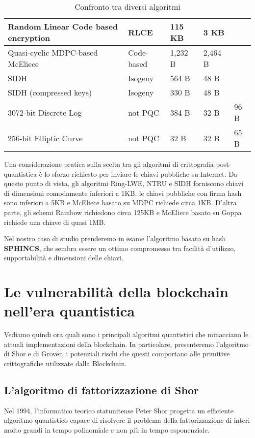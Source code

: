 \begin{table}[]
{\begin{tabular}{|l|l|l|l|l|}
    Random Linear Code based encryption & RLCE           & 115 KB              & 3 KB                 &                    \\ \hline
    Quasi-cyclic MDPC-based McEliece    & Code-based     & 1,232 B             & 2,464 B              &                    \\ \hline
    SIDH                                & Isogeny        & 564 B               & 48 B                 &                    \\ \hline
    SIDH (compressed keys)              & Isogeny        & 330 B               & 48 B                 &                    \\ \hline
    3072-bit Discrete Log               & not PQC        & 384 B               & 32 B                 & 96 B               \\ \hline
    256-bit Elliptic Curve              & not PQC        & 32 B                & 32 B                 & 65 B               \\ \hline
    \end{tabular}
  }
  \caption{Confronto tra diversi algoritmi}
  \label{tab:confronto}
\end{table}

Una considerazione pratica sulla scelta tra gli algoritmi di crittografia post-quantistica è lo sforzo richiesto per inviare le chiavi pubbliche su Internet. Da questo punto di vista, gli algoritmi Ring-LWE, NTRU e SIDH forniscono chiavi di dimensioni comodamente inferiori a 1KB, le chiavi pubbliche con firma hash sono inferiori a 5KB e McEliece basato su MDPC richiede circa 1KB. D'altra parte, gli schemi Rainbow richiedono circa 125KB e McEliece basato su Goppa richiede una chiave di quasi 1MB.

Nel nostro caso di studio prenderemo in esame l'algoritmo basato su hash \textbf{SPHINCS}, che sembra essere un ottimo compromesso tra facilità d'utilizzo, supportabilità e dimensioni delle chiavi.

\section{Le vulnerabilità della blockchain nell'era quantistica}
Vediamo quindi ora quali sono i principali algoritmi quantistici che minacciano le attuali implementazioni della blockchain. In particolare, presenteremo l'algoritmo di Shor e di Grover, i potenziali rischi che questi comportano alle primitive crittografiche utilizzate dalla Blockchain.

\subsection{L'algoritmo di fattorizzazione di Shor}
Nel 1994, l'informatico teorico statunitense Peter Shor progetta un efficiente algoritmo quantistico capace di risolvere il problema della fattorizzazione di interi molto grandi in tempo polinomiale e non più in tempo esponenziale.

